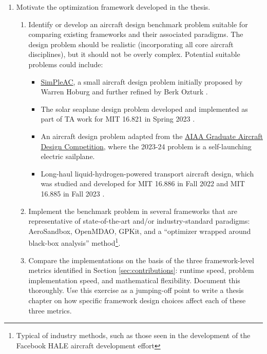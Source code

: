 \documentclass[12pt,vi,oneside]{report}
\begin{document}
    \begin{enumerate}
        \item Motivate the optimization framework developed in the thesis.
        \begin{enumerate}
            \item Identify or develop an aircraft design benchmark problem suitable for comparing existing frameworks and their associated paradigms. The design problem should be realistic (incorporating all core aircraft disciplines), but it should not be overly complex. Potential suitable problems could include:
            \begin{itemize}[noitemsep]
                \item \href{https://github.com/peterdsharpe/AeroSandbox/blob/master/tutorial/02%20-%20Design%20Optimization/03%20-%20Aircraft%20Design%20-%20SimPleAC.ipynb}{SimPleAC}, a small aircraft design problem initially proposed by Warren Hoburg \cite{hoburg_geometric_2014} and further refined by Berk Ozturk \cite{ozturk_conceptual_2018}.
                \item The solar seaplane design problem developed and implemented as part of TA work for MIT 16.821 in Spring 2023 \cite{solar_seaplane}.
                \item An aircraft design problem adapted from the \href{https://www.aiaa.org/get-involved/students-educators/Design-Competitions}{AIAA Graduate Aircraft Design Competition}, where the 2023-24 problem is a self-launching electric sailplane.
                \item Long-haul liquid-hydrogen-powered transport aircraft design, which was studied and developed for MIT 16.886 in Fall 2022 and MIT 16.885 in Fall 2023 \cite{gaubatz_estimating_2023, transport_aircraft}.
            \end{itemize}
            \item Implement the benchmark problem in several frameworks that are representative of state-of-the-art and/or industry-standard paradigms: AeroSandbox, OpenMDAO, GPKit, and a ``optimizer wrapped around black-box analysis'' method\footnote{Typical of industry methods, such as those seen in the development of the Facebook HALE aircraft development effort\cite{fbhale}}.
            \item Compare the implementations on the basis of the three framework-level metrics identified in Section \ref{sec:contributions}: runtime speed, problem implementation speed, and mathematical flexibility. Document this thoroughly. Use this exercise as a jumping-off point to write a thesis chapter on how specific framework design choices affect each of these three metrics.

\end{enumerate}
\end{enumerate}
\end{document}
